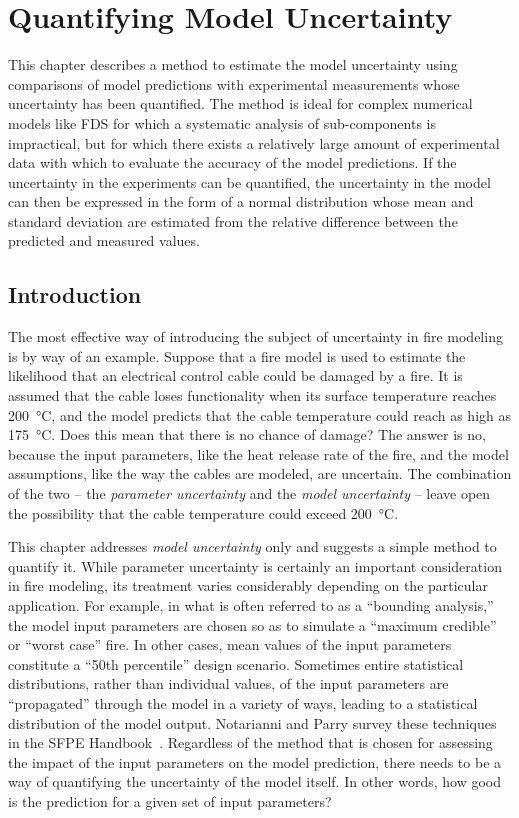 
\chapter{Quantifying Model Uncertainty}
\label{Error_Chapter}

This chapter describes a method to estimate the model uncertainty using comparisons of model predictions with experimental measurements whose uncertainty has been quantified. The method is ideal for complex numerical models like FDS for which a systematic analysis of sub-components is impractical, but for which there exists a relatively large amount of experimental data with which to evaluate the accuracy of the model predictions. If the uncertainty in the experiments can be quantified, the uncertainty in the model can then be expressed in the form of a normal distribution whose mean and standard deviation are estimated from the relative difference between the predicted and measured values.


\section{Introduction}

The most effective way of introducing the subject of uncertainty in fire modeling is by way of an example. Suppose that a fire model is used to estimate the likelihood that an electrical control cable could be damaged by a fire. It is assumed that the cable loses functionality when its surface temperature reaches 200~\unit{\degreeCelsius}, and the model predicts that the cable temperature could reach as high as 175~\unit{\degreeCelsius}. Does this mean that there is no chance of damage? The answer is no, because the input parameters, like the heat release rate of the fire, and the model assumptions, like the way the cables are modeled, are uncertain. The combination of the two -- the {\em parameter uncertainty} and the {\em model uncertainty} -- leave open the possibility that the cable temperature could exceed 200~\unit{\degreeCelsius}.

This chapter addresses {\em model uncertainty} only and suggests a simple method to quantify it. While parameter uncertainty is certainly an important consideration in fire modeling, its treatment varies considerably depending on the particular application. For example, in what is often referred to as a ``bounding analysis,'' the model input parameters are chosen so as to simulate a ``maximum credible'' or ``worst case'' fire. In other cases, mean values of the input parameters constitute a ``50th percentile'' design scenario. Sometimes entire statistical distributions, rather than individual values, of the input parameters are ``propagated'' through the model in a variety of ways, leading to a statistical distribution of the model output. Notarianni and Parry survey these techniques in the SFPE Handbook~\cite{Notarianni:SFPE}. Regardless of the method that is chosen for assessing the impact of the input parameters on the model prediction, there needs to be a way of quantifying the uncertainty of the model itself. In other words, how good is the prediction for a given set of input parameters?


